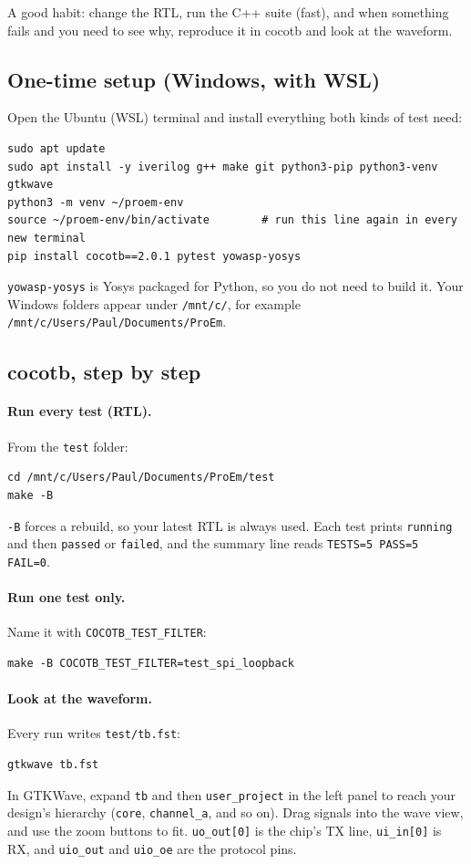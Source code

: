 \documentclass[11pt,a4paper]{article}
\newcommand{\file}[1]{\texttt{#1}}
\begin{document}
A good habit: change the RTL, run the C++ suite (fast), and when something fails and you need to see why, reproduce it in cocotb and look at the waveform.

\subsection{One-time setup (Windows, with WSL)}

Open the Ubuntu (WSL) terminal and install everything both kinds of test need:

\begin{lstlisting}
sudo apt update
sudo apt install -y iverilog g++ make git python3-pip python3-venv gtkwave
python3 -m venv ~/proem-env
source ~/proem-env/bin/activate        # run this line again in every new terminal
pip install cocotb==2.0.1 pytest yowasp-yosys
\end{lstlisting}

\texttt{yowasp-yosys} is Yosys packaged for Python, so you do not need to build it. Your Windows folders appear under \file{/mnt/c/}, for example \file{/mnt/c/Users/Paul/Documents/ProEm}.

\subsection{cocotb, step by step}

\paragraph{Run every test (RTL).} From the \file{test} folder:
\begin{lstlisting}
cd /mnt/c/Users/Paul/Documents/ProEm/test
make -B
\end{lstlisting}
\texttt{-B} forces a rebuild, so your latest RTL is always used. Each test prints \texttt{running} and then \texttt{passed} or \texttt{failed}, and the summary line reads \texttt{TESTS=5 PASS=5 FAIL=0}.

\paragraph{Run one test only.} Name it with \texttt{COCOTB\_TEST\_FILTER}:
\begin{lstlisting}
make -B COCOTB_TEST_FILTER=test_spi_loopback
\end{lstlisting}

\paragraph{Look at the waveform.} Every run writes \file{test/tb.fst}:
\begin{lstlisting}
gtkwave tb.fst
\end{lstlisting}
In GTKWave, expand \texttt{tb} and then \texttt{user\_project} in the left panel to reach your design's hierarchy (\texttt{core}, \texttt{channel\_a}, and so on). Drag signals into the wave view, and use the zoom buttons to fit. \texttt{uo\_out[0]} is the chip's TX line, \texttt{ui\_in[0]} is RX, and \texttt{uio\_out} and \texttt{uio\_oe} are the protocol pins.
\end{document}
